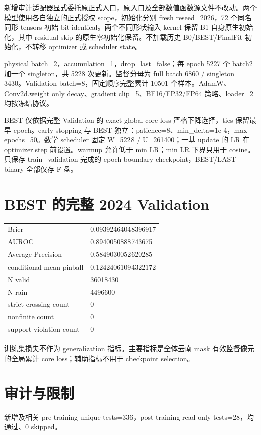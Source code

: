 \documentclass[UTF8,11pt,fontset=windows]{ctexart}
\begin{document}
新增审计适配器显式委托原正式入口，原入口及全部数值函数源文件不改动。两个模型使用各自独立的正式授权 scope，初始化分别 fresh reseed=2026，72 个同名同形 tensors 初始 bit-identical。两个不同形状输入 kernel 保留 B1 自身原生初始化，其中 residual skip 的原生零初始化保留。不加载历史 B0/BEST/FinalFit 初始化，不转移 optimizer 或 scheduler state。

physical batch=2，accumulation=1，drop\_last=false；每 epoch 5227 个 batch2 加一个 singleton，共 5228 次更新。监督分母为 full batch 6860 / singleton 3430。Validation batch=8，固定顺序完整累计 10501 个样本。AdamW、Conv2d.weight only decay、gradient clip=5、BF16/FP32/FP64 策略、loader=2 均按冻结协议。

BEST 仅依据完整 Validation 的 exact global core loss 严格下降选择，ties 保留最早 epoch。early stopping 与 BEST 独立：patience=8、min\_delta=1e-4，max epochs=50。数学 scheduler 固定 W=5228 / U=261400；一基 update 的 LR 在 optimizer.step 前设置。warmup 允许低于 min LR；min LR 下界只用于 cosine。只保存 train+validation 完成的 epoch boundary checkpoint，BEST/LAST binary 全部仅存 F 盘。

\section*{BEST 的完整 2024 Validation}
\begin{tabularx}{\textwidth}{@{}p{41mm}Y@{}}\toprule
Brier & 0.09392464048396917 \\
AUROC & 0.8940050888743675 \\
Average Precision & 0.5849030052620285 \\
conditional mean pinball & 0.12424061094322172 \\
N valid & 36018430 \\
N rain & 4496600 \\
strict crossing count & 0 \\
nonfinite count & 0 \\
support violation count & 0 \\
\bottomrule\end{tabularx}

训练集损失不作为 generalization 指标。主要指标是全体云南 mask 有效监督像元的全局累计 core loss；辅助指标不用于 checkpoint selection。

\section*{审计与限制}
新增及相关 pre-training unique tests=336，post-training read-only tests=28，均通过、0 skipped。
\end{document}
